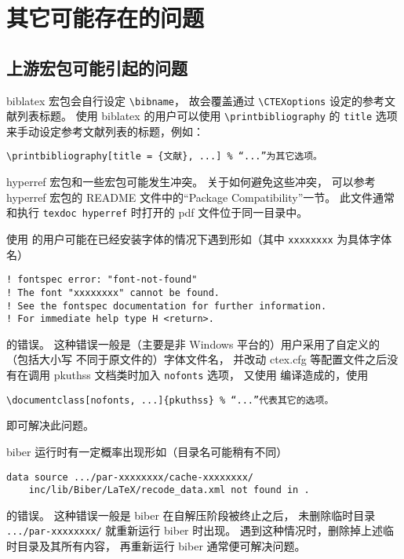 	\section{其它可能存在的问题}
		\subsection{上游宏包可能引起的问题}

		biblatex 宏包\supercite{biblatex}会自行设定 \verb|\bibname|，
		故会覆盖通过 \verb|\CTEXoptions| 设定的参考文献列表标题。
		使用 biblatex 的用户可以使用 \verb|\printbibliography| 的
		\verb|title| 选项来手动设定参考文献列表的标题，例如：
\begin{Verbatim}[frame = single]
\printbibliography[title = {文献}, ...] % “...”为其它选项。
\end{Verbatim}

		hyperref 宏包\supercite{hyperref}和一些宏包可能发生冲突。
		关于如何避免这些冲突，
		可以参考 hyperref 宏包的 README 文件中的“Package Compatibility”一节。
		此文件通常和执行 \verb|texdoc hyperref| %
		时打开的 pdf 文件位于同一目录中。

		使用  的用户可能在已经安装字体的情况下遇到形如（其中
		\verb|xxxxxxxx| 为具体字体名）
\begin{Verbatim}[frame = single, fontsize = {\small}]
! fontspec error: "font-not-found"
! The font "xxxxxxxx" cannot be found.
! See the fontspec documentation for further information.
! For immediate help type H <return>.
\end{Verbatim}
		的错误。
		这种错误一般是（主要是非 Windows 平台的）用户采用了自定义的（包括大小写
		不同于原文件的）字体文件名，
		并改动 ctex.cfg 等配置文件之后没有在调用 pkuthss 文档类时加入
		\verb|nofonts| 选项，
		又使用  编译造成的，使用
\begin{Verbatim}[frame = single]
\documentclass[nofonts, ...]{pkuthss} % “...”代表其它的选项。
\end{Verbatim}
		即可解决此问题。

		biber 运行时有一定概率出现形如（目录名可能稍有不同）
\begin{Verbatim}[frame = single, fontsize = {\small}]
data source .../par-xxxxxxxx/cache-xxxxxxxx/
	inc/lib/Biber/LaTeX/recode_data.xml not found in .
\end{Verbatim}
		的错误。
		这种错误一般是 biber 在自解压阶段被终止之后，
		未删除临时目录 \verb|.../par-xxxxxxxx/| 就重新运行 biber 时出现。
		遇到这种情况时，删除掉上述临时目录及其所有内容，
		再重新运行 biber 通常便可解决问题。

